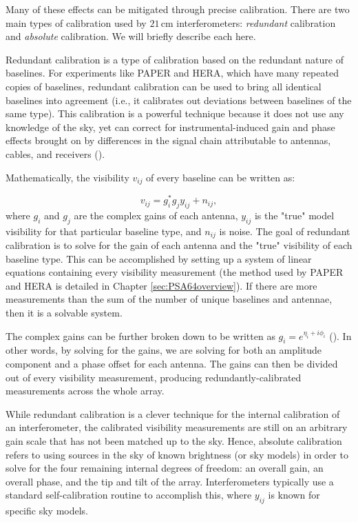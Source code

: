 Many of these effects can be mitigated through precise calibration. There are two main types of calibration used by $21$\,cm interferometers: \textit{redundant} calibration and \textit{absolute} calibration. We will briefly describe each here.

Redundant calibration is a type of calibration based on the redundant nature of baselines. For experiments like PAPER and HERA, which have many repeated copies of baselines, redundant calibration can be used to bring all identical baselines into agreement (i.e., it calibrates out deviations between baselines of the same type). This calibration is a powerful technique because it does not use any knowledge of the sky, yet can correct for instrumental-induced gain and phase effects brought on by differences in the signal chain attributable to antennas, cables, and receivers (\citealt{liu_et_al2010}).

Mathematically, the visibility $v_{ij}$ of every baseline can be written as:

\begin{equation}
\label{eq:gains}
v_{ij} = g_{i}^{\ast}g_{j}y_{ij} + n_{ij},
\end{equation}
where $g_{i}$ and $g_{j}$ are the complex gains of each antenna, $y_{ij}$ is the "true" model visibility for that particular baseline type, and $n_{ij}$ is noise. The goal of redundant calibration is to solve for the gain of each antenna and the "true" visibility of each baseline type. This can be accomplished by setting up a system of linear equations containing every visibility measurement (the method used by PAPER and HERA is detailed in Chapter \ref{sec:PSA64overview}). If there are more measurements than the sum of the number of unique baselines and antennae, then it is a solvable system. 

The complex gains can be further broken down to be written as $g_{i} = e^{\eta_{i} + i\phi_{i}}$ (\citealt{liu_et_al2010}). In other words, by solving for the gains, we are solving for both an amplitude component and a phase offset for each antenna. The gains can then be divided out of every visibility measurement, producing redundantly-calibrated measurements across the whole array.

While redundant calibration is a clever technique for the internal calibration of an interferometer, the calibrated visibility measurements are still on an arbitrary gain scale that has not been matched up to the sky. Hence, absolute calibration refers to using sources in the sky of known brightness (or sky models) in order to solve for the four remaining internal degrees of freedom: an overall gain, an overall phase, and the tip and tilt of the array. Interferometers typically use a standard self-calibration routine to accomplish this, where $y_{ij}$ is known for specific sky models.

